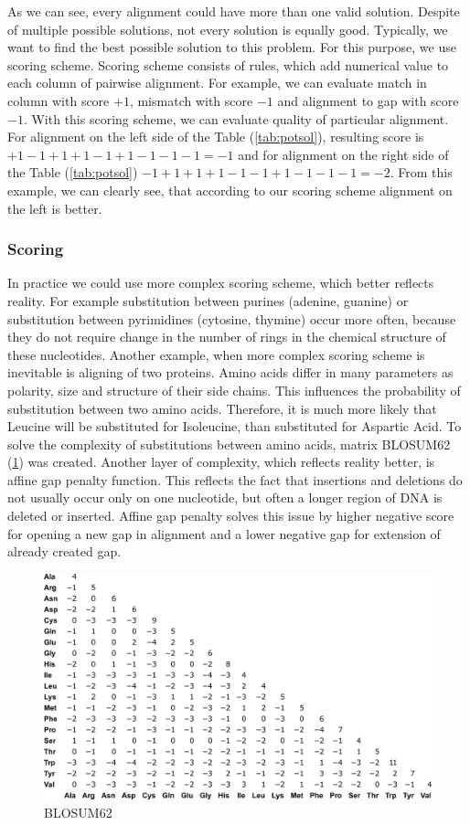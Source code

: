 As we can see, every alignment could have more than one valid solution.
Despite of multiple possible solutions, not every solution is equally good.
Typically, we want to find the best possible solution to this problem.
For this purpose, we use scoring scheme.
Scoring scheme consists of rules, which add numerical value to each column of pairwise alignment.
For example, we can evaluate match in column with score $+1$, mismatch with score $-1$ and alignment to gap with score $-1$.
With this scoring scheme, we can evaluate quality of particular alignment.
For alignment on the left side of the Table (\ref{tab:potsol}), resulting score is $+1-1+1+1-1+1-1-1-1 = -1$ and for alignment on the right side of the Table (\ref{tab:potsol}) $-1+1+1+1-1-1+1-1-1-1 = -2$.
From this example, we can clearly see, that according to our scoring scheme alignment on the left is better.

\subsubsection{Scoring}
In practice we could use more complex scoring scheme, which better reflects reality.
For example substitution between purines (adenine, guanine) or substitution between pyrimidines (cytosine, thymine) occur more often, because they do not require change in the number of rings in the chemical structure of these nucleotides.
Another example, when more complex scoring scheme is inevitable is aligning of two proteins.
Amino acids differ in many parameters as polarity, size and structure of their side chains.
This influences the probability of substitution between two amino acids.
Therefore, it is much more likely that Leucine will be substituted for Isoleucine, than substituted for Aspartic Acid.
To solve the complexity of substitutions between amino acids, matrix BLOSUM62 (\ref{fig:blosum}) was created.
Another layer of complexity, which reflects reality better, is affine gap penalty function.
This reflects the fact that insertions and deletions do not usually occur only on one nucleotide, but often a longer region of DNA is deleted or inserted.
Affine gap penalty solves this issue by higher negative score for opening a new gap in alignment and a lower negative gap for extension of already created gap.

\begin{figure}[ht]
  \centering
    \includegraphics[width=\textwidth]{./images/blosum62.png}
  \caption{BLOSUM62}
  \label{fig:blosum}
\end{figure}


